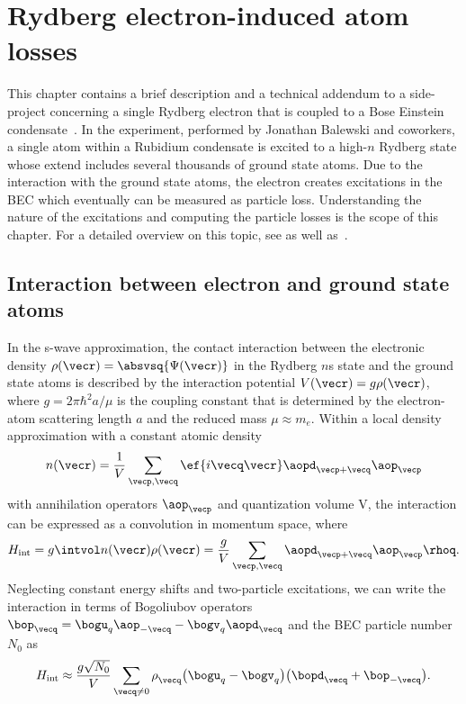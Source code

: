 \chapter{Rydberg electron-induced atom losses}
\label{rydberg_losses}

This chapter contains a brief description and a technical addendum to a side-project concerning a single Rydberg electron that is coupled to a Bose Einstein condensate~\cite{Balewski2013}.
In the experiment, performed by Jonathan Balewski and coworkers, a single atom within a Rubidium condensate is excited to a high-$n$ Rydberg state whose extend includes several thousands of ground state atoms.
Due to the interaction with the ground state atoms, the electron creates excitations in the BEC which eventually can be measured as particle loss.
Understanding the nature of the excitations and computing the particle losses is the scope of this chapter.
For a detailed overview on this topic, see  as well as~.

\section{Interaction between electron and ground state atoms}
In the s-wave approximation, the contact interaction between the electronic density $\rho(\vecr)=\absvsq{\Psi(\vecr)}$ in the Rydberg $n$s state and the ground state atoms is described by the interaction potential $V(\vecr)=g \rho(\vecr)$, where $g=2\pi \hbar^2 a/\mu$ is the coupling constant that is determined by the electron-atom scattering length $a$ and the reduced mass $\mu \approx m_e$. Within a local density approximation with a constant atomic density
\begin{align}
    n(\vecr)=\frac{1}{V} \sum_{\vecp,\vecq} \ef{i\vecq\vecr}\aopd_{\vecp+\vecq} \aop_{\vecp}
\end{align}
with annihilation operators $\aop_{\vecp}$ and quantization volume V, the interaction can be expressed as a convolution in momentum space, where
\begin{align}
H_\text{int} = g\intvol n(\vecr)\rho(\vecr) = \frac{g}{V} \sum_{\vecp,\vecq} \aopd_{\vecp+\vecq} \aop_{\vecp} \rhoq.
\end{align}
Neglecting constant energy shifts and two-particle excitations, we can write the interaction in terms of Bogoliubov operators $\bop_{\vecq}=\bogu_q \aop_{-\vecq} - \bogv_q \aopd_{\vecq}$ and the BEC particle number $N_0$ as
\begin{align}
H_\text{int}\approx\frac{g\sqrt{N_0}}{V} \sum_{\vecq\ne 0} \rho^{\phantom\dagger}_{\vecq} \big(\bogu_{q}-\bogv_{q}\big) \big(\bopd_{\vecq}+\bop_{-\vecq}\big).
\end{align}
